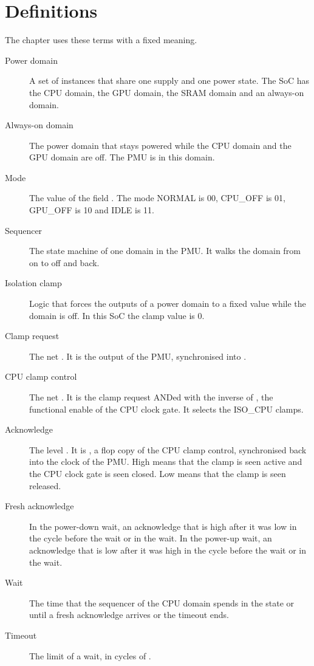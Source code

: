 \section{Definitions}\label{ds:ch:mod-power-management:definitions}
The chapter uses these terms with a fixed meaning.
\begin{description}
  \item[Power domain] A set of instances that share one supply and one power state. The SoC has the CPU domain, the GPU domain, the SRAM domain and an always-on domain.
  \item[Always-on domain] The power domain that stays powered while the CPU domain and the GPU domain are off. The PMU is in this domain.
  \item[Mode] The value of the field . The mode NORMAL is 00, CPU\_OFF is 01, GPU\_OFF is 10 and IDLE is 11.
  \item[Sequencer] The state machine of one domain in the PMU. It walks the domain from on to off and back.
  \item[Isolation clamp] Logic that forces the outputs of a power domain to a fixed value while the domain is off. In this SoC the clamp value is 0.
  \item[Clamp request] The net . It is the output  of the PMU, synchronised into .
  \item[CPU clamp control] The net . It is the clamp request ANDed with the inverse of , the functional enable of the CPU clock gate. It selects the ISO\_CPU clamps.
  \item[Acknowledge] The level . It is , a flop copy of the CPU clamp control, synchronised back into the clock of the PMU. High means that the clamp is seen active and the CPU clock gate is seen closed. Low means that the clamp is seen released.
  \item[Fresh acknowledge] In the power-down wait, an acknowledge that is high after it was low in the cycle before the wait or in the wait. In the power-up wait, an acknowledge that is low after it was high in the cycle before the wait or in the wait.
  \item[Wait] The time that the sequencer of the CPU domain spends in the state  or  until a fresh acknowledge arrives or the timeout ends.
  \item[Timeout] The limit  of a wait, in cycles of .
\end{description}

